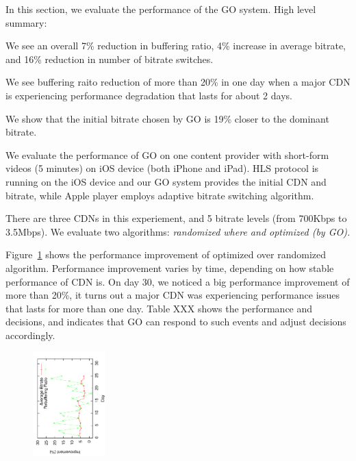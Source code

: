 
In this section, we evaluate the performance of the GO system. High level summary:
\begin{packedenumerate}
    \item We see an overall 7\% reduction in buffering ratio, 4\% increase in average bitrate, and 16\% reduction in number of bitrate switches.
    \item We see buffering raito reduction of more than 20\% in one day when a major CDN is experiencing performance degradation that lasts for about 2 days.
    \item We show that the initial bitrate chosen by GO is 19\% closer to the dominant bitrate.
\end{packedenumerate}


We evaluate the performance of GO on one content provider with short-form videos (5 minutes) on iOS device (both iPhone and iPad). 
HLS protocol is running on the iOS device and our GO system provides the initial CDN and bitrate, while Apple player employs adaptive 
bitrate switching algorithm. 

There are three CDNs in this experiement, and 5 bitrate levels (from 700Kbps to 3.5Mbps). We evaluate two algorithms: \it{randomized} where
and \it{optimized} (by GO).


Figure~\ref{fig:perf-impr} shows the performance improvement of optimized over randomized algorithm. Performance improvement varies by time,
depending on how stable performance of CDN is. On day 30, we noticed a big performance improvement of more than 20\%,
it turns out a major CDN was experiencing performance issues that lasts for more than one day. Table XXX shows the 
performance and decisions, and indicates that GO can respond to such events and adjust decisions accordingly.

\begin{figure}[h!]
\centering
 \includegraphics[width=0.25\textwidth, angle=270] {figures/eval-perfimp.pdf}
\label{fig:perf-impr}
\end{figure}


